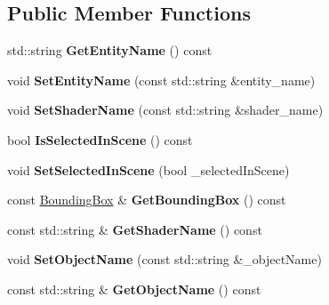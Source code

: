 \subsection*{Public Member Functions}
\begin{DoxyCompactItemize}
\item 
\mbox{\label{classpiolot_1_1_entity_afcf183909460f962951d9775126e35dc}} 
std\+::string {\bfseries Get\+Entity\+Name} () const
\item 
\mbox{\label{classpiolot_1_1_entity_a4b458394b15a68f6ecf19e79b60f8730}} 
void {\bfseries Set\+Entity\+Name} (const std\+::string \&entity\+\_\+name)
\item 
\mbox{\label{classpiolot_1_1_entity_a1c52edf232af06086a4058c46d2cb783}} 
void {\bfseries Set\+Shader\+Name} (const std\+::string \&shader\+\_\+name)
\item 
\mbox{\label{classpiolot_1_1_entity_ae2f2a9ae6613e02d69129e5346884f4e}} 
bool {\bfseries Is\+Selected\+In\+Scene} () const
\item 
\mbox{\label{classpiolot_1_1_entity_ab989dc8df66c461663c431993b5b2334}} 
void {\bfseries Set\+Selected\+In\+Scene} (bool \+\_\+selected\+In\+Scene)
\item 
\mbox{\label{classpiolot_1_1_entity_a71f340517f503b0187e96e3f0097fdbc}} 
const \mbox{\hyperlink{classpiolot_1_1_bounding_box}{Bounding\+Box}} \& {\bfseries Get\+Bounding\+Box} () const
\item 
\mbox{\label{classpiolot_1_1_entity_a95f3ad12bcec709938fb35633d51a3f5}} 
const std\+::string \& {\bfseries Get\+Shader\+Name} () const
\item 
\mbox{\label{classpiolot_1_1_entity_a575051c2dffebde6948c421bb9153c3c}} 
void {\bfseries Set\+Object\+Name} (const std\+::string \&\+\_\+object\+Name)
\item 
\mbox{\label{classpiolot_1_1_entity_a2eeb2cd5d0daf98c49b0e2d2d6227e6d}} 
const std\+::string \& {\bfseries Get\+Object\+Name} () const

\end{DoxyCompactItemize}
